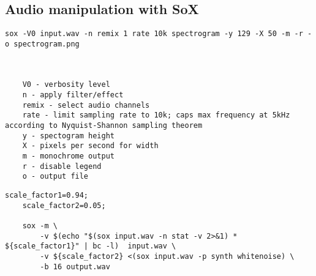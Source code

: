 \begin{appendices}
\section{Audio manipulation with SoX}

    \begin{lstlisting}[caption=Generating monochrome spectrograms with SoX]
    sox -V0 input.wav -n remix 1 rate 10k spectrogram -y 129 -X 50 -m -r -o spectrogram.png
    
    
    
    V0 - verbosity level 
    n - apply filter/effect
    remix - select audio channels
    rate - limit sampling rate to 10k; caps max frequency at 5kHz according to Nyquist-Shannon sampling theorem
    y - spectogram height
    X - pixels per second for width
    m - monochrome output
    r - disable legend
    o - output file
    \end{lstlisting}
    
    \begin{lstlisting}[caption=Adding white noise to an audio file]
    scale_factor1=0.94; 
    scale_factor2=0.05;
     
    sox -m \
        -v $(echo "$(sox input.wav -n stat -v 2>&1) * ${scale_factor1}" | bc -l)  input.wav \
        -v ${scale_factor2} <(sox input.wav -p synth whitenoise) \
        -b 16 output.wav
   \end{lstlisting}

\end{appendices}